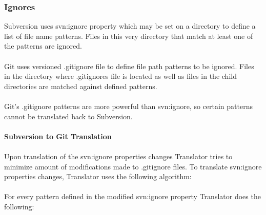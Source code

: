 \subsubsection{Ignores}
Subversion uses svn:ignore property which may be set on a directory to define a list of
file name patterns. Files in this very directory that match at least one of the patterns are ignored.
\\\\
Git uses versioned .gitignore file to define file path patterns to be ignored. Files in the directory
where .gitignores file is located as well as files in the child directories are matched against defined patterns.
\\\\
Git's .gitignore patterns are more powerful than svn:ignore, so certain patterns cannot be translated back to Subversion.
\\\\
\textbf{Subversion to Git Translation}
\\\\
Upon translation of the svn:ignore properties changes Translator tries to minimize amount of modifications
made to .gitignore files. To translate svn:ignore properties changes, Translator uses the following algorithm:
\\\\
For every pattern defined in the modified svn:ignore property Translator does the following:
